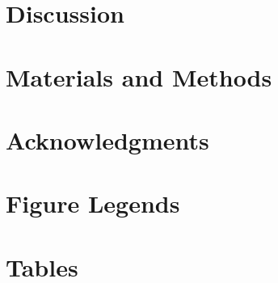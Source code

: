 \documentclass[10pt]{article}
\begin{document}
\begin{spacing}{1.5}



\section*{Discussion}

\section*{Materials and Methods}





\section*{Acknowledgments}




\section*{Figure Legends}


\section*{Tables}


\end{spacing}
\end{document}

